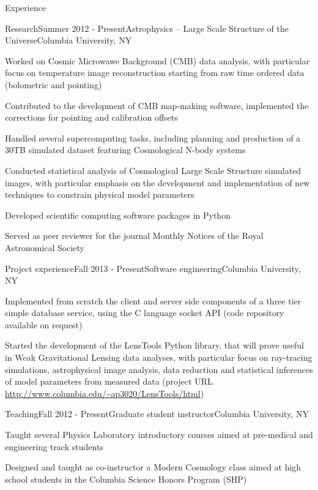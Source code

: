 \documentclass{resume} %
\begin{document}
\begin{rSection}{Experience}

\begin{rSubsection}{Research}{Summer 2012 - Present}{Astrophysics -- Large Scale Structure of the Universe}{Columbia University, NY}
\item Worked on Cosmic Microwawe Background (CMB) data analysis, with particular focus on temperature image reconstruction starting from raw time ordered data (bolometric and pointing) 
\item Contributed to the development of CMB map-making software, implemented the corrections for pointing and calibration offsets
\item Handled several supercomputing tasks, including planning and production of a 30TB simulated dataset featuring Cosmological N-body systems
\item Conducted statistical analysis of Cosmological Large Scale Structure simulated images, with particular emphasis on the development and implementation of new techniques to constrain physical model parameters
\item Developed scientific computing software packages in Python
\item Served as peer reviewer for the journal Monthly Notices of the Royal Astronomical Society
\end{rSubsection}


\begin{rSubsection}{Project experience}{Fall 2013 - Present}{Software engineering}{Columbia University, NY}
\item Implemented from scratch the client and server side components of a three tier simple database service, using the C language socket API (code repository available on request)
\item Started the development of the LensTools Python library, that will prove useful in Weak Gravitational Lensing data analyses, with particular focus on ray-tracing simulations, astrophysical image analysis, data reduction and statistical inferences of model parameters from measured data (project URL \url{http://www.columbia.edu/~ap3020/LensTools/html})
\end{rSubsection}


\begin{rSubsection}{Teaching}{Fall 2012 - Present}{Graduate student instructor}{Columbia University, NY}
\item Taught several Physics Laboratory introductory courses aimed at pre-medical and engineering track students
\item Designed and taught as co-instructor a Modern Cosmology class aimed at high school students in the Columbia Science Honors Program (SHP)   
\end{rSubsection}

\end{rSection}
\end{document}
